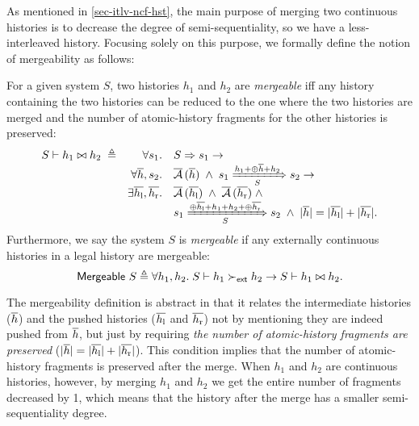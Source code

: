 As mentioned in \autoref{sec-itlv-ncf-hst}, the main purpose of merging two continuous histories is to decrease the degree of semi-sequentiality, so we have a less-interleaved history.
Focusing solely on this purpose, we formally define the notion of mergeability as follows:
\begin{definition}[Mergeability]
  \label{def-mgb}
  For a given system $S$, two histories $h_1$ and $h_2$ are \emph{mergeable} iff any history containing the two histories can be reduced to the one where the two histories are merged and the number of atomic-history fragments for the other histories is preserved:
  \begin{displaymath}
    \begin{array}{rrl}
      \hmgb{S}{h_1}{h_2}\; \triangleq & \forall s_1. & \semrch{S}{s_1} \to\\
      & \forall \listof{h}, s_2. & \atomicHsts{\listof{h}} \;\wedge\;
      \semsteps{S}{s_1}{\listapp{h_1}{\listapp{\listconcat{\listof{h}}}{h_2}}}{s_2} \to\\
      & \exists \listof{h_{\textrm{l}}}, \listof{h_{\textrm{r}}}.
      & \atomicHsts{\listof{h_{\textrm{l}}}} \;\wedge\; \atomicHsts{\listof{h_{\textrm{r}}}} \;\wedge\\
      & & \semsteps{S}{s_1}{\listapp{\listconcat{\listof{h_{\textrm{l}}}}}{\listapp{h_1}{\listapp{h_2}{\listconcat{\listof{h_{\textrm{r}}}}}}}}{s_2} \;\wedge\; \sizeof{\listof{h}} = \sizeof{\listof{h_{\textrm{l}}}} + \sizeof{\listof{h_{\textrm{r}}}}.
    \end{array}
  \end{displaymath}
  Furthermore, we say the system $S$ is \emph{mergeable} if any externally continuous histories in a legal history are mergeable:
  \begin{displaymath}
    \smgb{S} \triangleq \forall h_1, h_2.\; \hextcont{S}{h_1}{h_2} \to \hmgb{S}{h_1}{h_2}.
  \end{displaymath}
\end{definition}

The mergeability definition is abstract in that it relates the intermediate histories ($\listof{h}$) and the pushed histories ($\listof{h_{\textrm{l}}}$ and $\listof{h_{\textrm{r}}}$) not by mentioning they are indeed pushed from $\listof{h}$, but just by requiring \emph{the number of atomic-history fragments are preserved} ($\sizeof{\listof{h}} = \sizeof{\listof{h_{\textrm{l}}}} + \sizeof{\listof{h_{\textrm{r}}}}$).
This condition implies that the number of atomic-history fragments is preserved after the merge.
When $h_1$ and $h_2$ are continuous histories, however, by merging $h_1$ and $h_2$ we get the entire number of fragments decreased by 1, which means that the history after the merge has a smaller semi-sequentiality degree.

